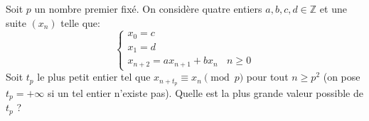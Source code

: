 \begin{exo}{}
Soit $p$ un nombre premier fixé. On considère quatre entiers $a,b,c,d\in \mathbb{Z}$ et une suite $(x_n)$ telle que:
$$\begin{cases}x_0=c \\x_1=d \\x_{n+2}=ax_{n+1}+bx_n ~~~~n\ge 0\end{cases}$$
Soit $t_p$ le plus petit entier tel que $x_{n+t_p}\equiv x_n\pmod p$ pour tout $n\ge p^2$ (on pose $t_p=+\infty$ si un tel entier n'existe pas). Quelle est la plus grande valeur possible de $t_p$ ? \\~~\\
\end{exo}





